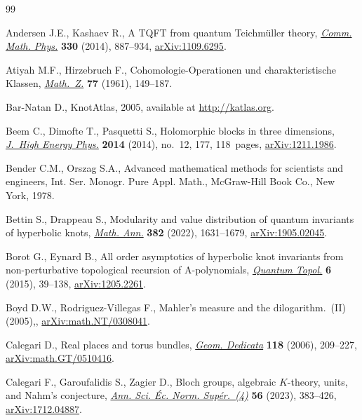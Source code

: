 \documentclass[pdftex]{sigma}
\numberwithin{equation}{section}
\begin{document}
\begin{thebibliography}{99}
\footnotesize\itemsep=0pt

Andersen J.E., Kashaev R., A {TQFT} from quantum {T}eichm\"uller theory,
 \href{https://doi.org/10.1007/s00220-014-2073-2}{\textit{Comm. Math. Phys.}} \textbf{330} (2014), 887--934, \href{https://arxiv.org/abs/1109.6295}{arXiv:1109.6295}.

Atiyah M.F., Hirzebruch F., Cohomologie-{O}perationen und charakteristische
 {K}lassen, \href{https://doi.org/10.1007/BF01180171}{\textit{Math.~Z.}} \textbf{77} (1961), 149--187.

Bar-Natan D., KnotAtlas, 2005, available at \url{http://katlas.org}.

Beem C., Dimofte T., Pasquetti S., Holomorphic blocks in three dimensions,
 \href{https://doi.org/10.1007/JHEP12(2014)177}{\textit{J.~High Energy Phys.}} \textbf{2014} (2014), no.~12, 177, 118~pages,
 \href{https://arxiv.org/abs/1211.1986}{arXiv:1211.1986}.

Bender C.M., Orszag S.A., Advanced mathematical methods for scientists and
 engineers, Int. Ser. Monogr. Pure Appl. Math., McGraw-Hill Book Co., New
 York, 1978.

Bettin S., Drappeau S., Modularity and value distribution of quantum invariants
 of hyperbolic knots, \href{https://doi.org/10.1007/s00208-021-02288-2}{\textit{Math. Ann.}} \textbf{382} (2022), 1631--1679,
 \href{https://arxiv.org/abs/1905.02045}{arXiv:1905.02045}.

Borot G., Eynard B., All order asymptotics of hyperbolic knot invariants from
 non-perturbative topological recursion of {A}-polynomials, \href{https://doi.org/10.4171/QT/60}{\textit{Quantum
 Topol.}} \textbf{6} (2015), 39--138, \href{https://arxiv.org/abs/1205.2261}{arXiv:1205.2261}.

Boyd D.W., Rodriguez-Villegas F., Mahler's measure and the dilogarithm.~{(II)}
 (2005),, \href{https://arxiv.org/abs/math.NT/0308041}{arXiv:math.NT/0308041}.

Calegari D., Real places and torus bundles, \href{https://doi.org/10.1007/s10711-005-9037-9}{\textit{Geom. Dedicata}}
 \textbf{118} (2006), 209--227, \href{https://arxiv.org/abs/math.GT/0510416}{arXiv:math.GT/0510416}.

Calegari F., Garoufalidis S., Zagier D., Bloch groups, algebraic {$K$}-theory,
 units, and {N}ahm's conjecture, \href{https://doi.org/10.24033/asens.2537}{\textit{Ann. Sci. \'Ec. Norm. Sup\'er.~(4)}}
 \textbf{56} (2023), 383--426, \href{https://arxiv.org/abs/1712.04887}{arXiv:1712.04887}.


\end{thebibliography}
\end{document}
